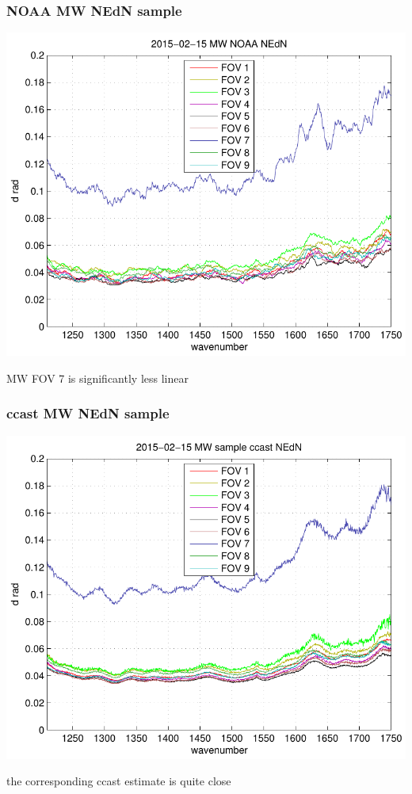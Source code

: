 \documentclass[11pt]{beamer}
\begin{document}
\begin{frame}
\frametitle{NOAA MW NEdN sample}

\begin{center}
  \includegraphics[scale=0.54]{figures/nedn_noaa_MW.pdf}
\end{center}

\centerline{MW FOV 7 is significantly less linear}

\end{frame}
\begin{frame}
\frametitle{ccast MW NEdN sample}

\begin{center}
  \includegraphics[scale=0.54]{figures/nedn_ccast_MW.pdf}
\end{center}

\centerline{the corresponding ccast estimate is quite close}

\end{frame}
\end{document}
